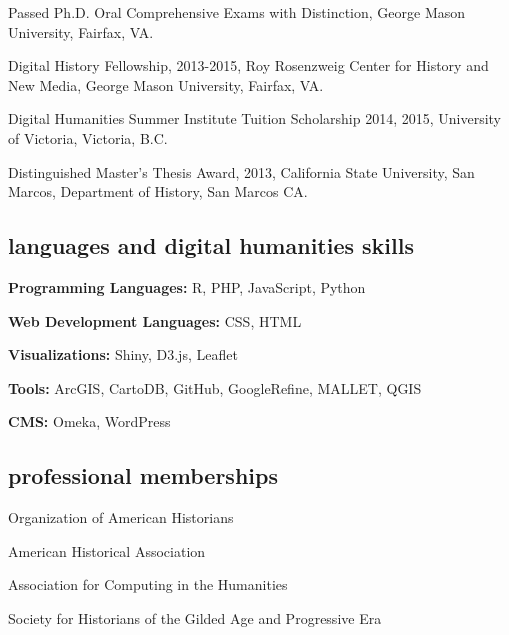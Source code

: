 \documentclass[11pt]{article}
\begin{document}
Passed Ph.D. Oral Comprehensive Exams with Distinction, George Mason University, Fairfax, VA.

Digital History Fellowship, 2013-2015, Roy Rosenzweig Center for History and New Media, George Mason University, Fairfax, VA.

Digital Humanities Summer Institute Tuition Scholarship 2014, 2015, University of Victoria, Victoria, B.C.

Distinguished Master's Thesis Award, 2013, California State University, San Marcos, Department of History, San Marcos CA.


\subsection{languages and digital humanities skills}
\textbf{Programming Languages:} R, PHP, JavaScript, Python

\textbf{Web Development Languages:} CSS, HTML

\textbf{Visualizations:} Shiny, D3.js, Leaflet

\textbf{Tools:} ArcGIS, CartoDB, GitHub, GoogleRefine, MALLET, QGIS

\textbf{CMS:} Omeka, WordPress

\subsection{professional memberships}
Organization of American Historians

American Historical Association

Association for Computing in the Humanities

Society for Historians of the Gilded Age and Progressive Era
\end{document}
